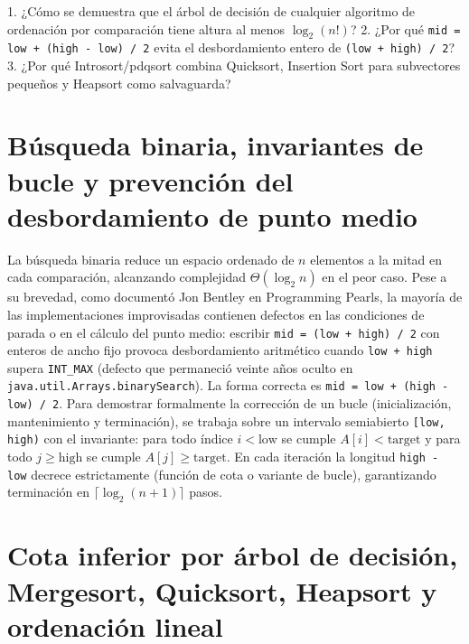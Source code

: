 \documentclass{book}
\begin{document}
\begin{tcolorbox}[title={Autoficha}, studiumcheck, breakable]

1. ¿Cómo se demuestra que el árbol de decisión de cualquier algoritmo de ordenación por comparación tiene altura al menos \(\log_2(n!)\)? 2. ¿Por qué \texttt{mid = low + (high - low) / 2} evita el desbordamiento entero de \texttt{(low + high) / 2}? 3. ¿Por qué Introsort/pdqsort combina Quicksort, Insertion Sort para subvectores pequeños y Heapsort como salvaguarda?
\end{tcolorbox}

\section{Búsqueda binaria, invariantes de bucle y prevención del desbordamiento de punto medio}

La búsqueda binaria reduce un espacio ordenado de \(n\) elementos a la mitad en cada comparación, alcanzando complejidad \(\Theta(\log_2 n)\) en el peor caso. Pese a su brevedad, como documentó Jon Bentley en Programming Pearls, la mayoría de las implementaciones improvisadas contienen defectos en las condiciones de parada o en el cálculo del punto medio: escribir \texttt{mid = (low + high) / 2} con enteros de ancho fijo provoca desbordamiento aritmético cuando \texttt{low + high} supera \texttt{INT\_MAX} (defecto que permaneció veinte años oculto en \texttt{java.util.Arrays.binarySearch}). La forma correcta es \texttt{mid = low + (high - low) / 2}.
Para demostrar formalmente la corrección de un bucle (inicialización, mantenimiento y terminación), se trabaja sobre un intervalo semiabierto \texttt{[low, high)} con el invariante: para todo índice \(i < \text{low}\) se cumple \(A[i] < \text{target}\) y para todo \(j \ge \text{high}\) se cumple \(A[j] \ge \text{target}\). En cada iteración la longitud \texttt{high - low} decrece estrictamente (función de cota o variante de bucle), garantizando terminación en \(\lceil \log_2(n+1) \rceil\) pasos.

\section{Cota inferior por árbol de decisión, Mergesort, Quicksort, Heapsort y ordenación lineal}
\end{document}
